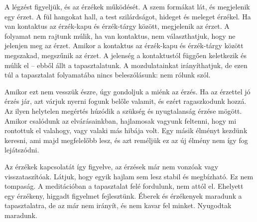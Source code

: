 A légzést figyeljük, és az érzékek működését. A szem formákat lát, és
megjelenik egy érzet. A fül hangokat hall, a test szilárdságot, hideget
és meleget érzékel. Ha van kontaktus az érzék-kapu és érzék-tárgy
között, megjelenik az érzet. A folyamat nem rajtunk múlik, ha van
kontaktus, nem választhatjuk, hogy ne jelenjen meg az érzet. Amikor a
kontaktus az érzék-kapu és érzék-tárgy között megszakad, megszűnik az
érzet. A jelenség a kontaktustól függően keletkezik és múlik el -- ebből
állt a tapasztalatunk. A mozdulatainkat irányíthatjuk, de ezen túl a
tapasztalat folyamatába nincs beleszólásunk: nem rólunk szól.

Amikor ezt nem vesszük észre, úgy gondoljuk a miénk az érzés. Ha az
érzettel jó érzés jár, azt várjuk nyerni fogunk belőle valamit, és ezért
ragaszkodunk hozzá. Az ilyen helytelen megértés húzódik a szükség és
nyugtalanság érzése mögött. Amikor csalódunk az elvárásainkban,
hajlamosak vagyunk feltenni, hogy mi rontottuk el valahogy, vagy valaki
más hibája volt. Egy másik élményt kezdünk keresni, ami majd megfelelőbb
lesz, és azt reméljük ez az új élmény nem így fog lejátszódni.

\enlargethispage*{2\baselineskip}

Az érzékek kapcsolatát így figyelve, az érzések már nem vonzóak vagy
visszataszítóak. Látjuk, hogy egyik hajlam sem lesz stabil és
megbízható. Ez nem tompaság. A meditációban a tapasztalat felé
fordulunk, nem attól el. Ehelyett egy érzékeny, higgadt figyelmet
fejlesztünk. Éberek és érzékenyek maradunk a tapasztalatra, de az már
nem irányít, és nem kavar fel minket. Nyugodtak maradunk.

\clearpage
\figurepagelayout

